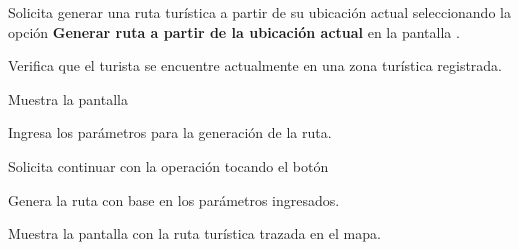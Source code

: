 	\begin{UCtrayectoria} 
		\UCpaso [\UCactor] Solicita generar una ruta turística a partir de su ubicación actual seleccionando la opción \textbf{Generar ruta a partir de la ubicación actual} en la pantalla .
		
		\UCpaso Verifica que el turista se encuentre actualmente en una zona turística registrada. 
		
		\UCpaso Muestra la pantalla  
		
		\UCpaso [\UCactor] Ingresa los parámetros para la generación de la ruta.
		
		\UCpaso [\UCactor] Solicita continuar con la operación tocando el botón 
		
		\UCpaso Genera la ruta con base en los parámetros ingresados.
		
		\UCpaso Muestra la pantalla  con la ruta turística trazada en el mapa.
		
	\end{UCtrayectoria}


	
	